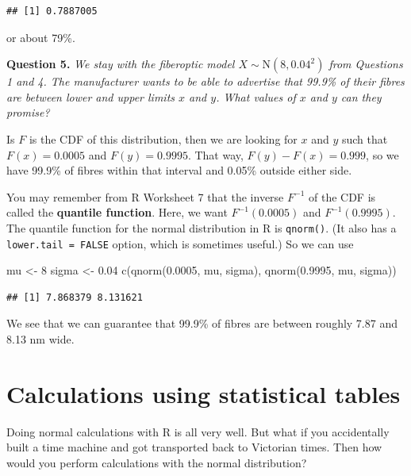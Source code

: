 \documentclass[
  a4paper,
]{book}
\newenvironment{Shaded}{\begin{snugshade}}{\end{snugshade}}
\newcommand{\DecValTok}[1]{\textcolor[rgb]{0.00,0.00,0.81}{#1}}
\newcommand{\FloatTok}[1]{\textcolor[rgb]{0.00,0.00,0.81}{#1}}
\newcommand{\FunctionTok}[1]{\textcolor[rgb]{0.00,0.00,0.00}{#1}}
\newcommand{\NormalTok}[1]{#1}
\newcommand{\OtherTok}[1]{\textcolor[rgb]{0.56,0.35,0.01}{#1}}
\theoremstyle{definition}
\theoremstyle{definition}
\theoremstyle{definition}
\theoremstyle{definition}
\theoremstyle{remark}
\begin{document}
\begin{verbatim}
## [1] 0.7887005
\end{verbatim}

or about 79\%.

\textbf{Question 5.} \emph{We stay with the fiberoptic model \(X \sim \mathrm{N}(8, 0.04^2)\) from Questions 1 and 4. The manufacturer wants to be able to advertise that 99.9\% of their fibres are between lower and upper limits \(x\) and \(y\). What values of \(x\) and \(y\) can they promise?}

Is \(F\) is the CDF of this distribution, then we are looking for \(x\) and \(y\) such that \(F(x) = 0.0005\) and \(F(y) = 0.9995\). That way, \(F(y) - F(x) = 0.999\), so we have 99.9\% of fibres within that interval and 0.05\% outside either side.

You may remember from R Worksheet 7 that the inverse \(F^{-1}\) of the CDF is called the \textbf{quantile function}. Here, we want \(F^{-1}(0.0005)\) and \(F^{-1}(0.9995)\). The quantile function for the normal distribution in R is \texttt{qnorm()}. (It also has a \texttt{lower.tail\ =\ FALSE} option, which is sometimes useful.) So we can use

\begin{Shaded}
\begin{Highlighting}[]
\NormalTok{mu }\OtherTok{\textless{}{-}} \DecValTok{8}
\NormalTok{sigma }\OtherTok{\textless{}{-}} \FloatTok{0.04}
\FunctionTok{c}\NormalTok{(}\FunctionTok{qnorm}\NormalTok{(}\FloatTok{0.0005}\NormalTok{, mu, sigma), }\FunctionTok{qnorm}\NormalTok{(}\FloatTok{0.9995}\NormalTok{, mu, sigma))}
\end{Highlighting}
\end{Shaded}

\begin{verbatim}
## [1] 7.868379 8.131621
\end{verbatim}

We see that we can guarantee that 99.9\% of fibres are between roughly 7.87 and 8.13 nm wide.

\hypertarget{normal-tables}{%
\section{Calculations using statistical tables}\label{normal-tables}}

Doing normal calculations with R is all very well. But what if you accidentally built a time machine and got transported back to Victorian times. Then how would you perform calculations with the normal distribution?
\end{document}
